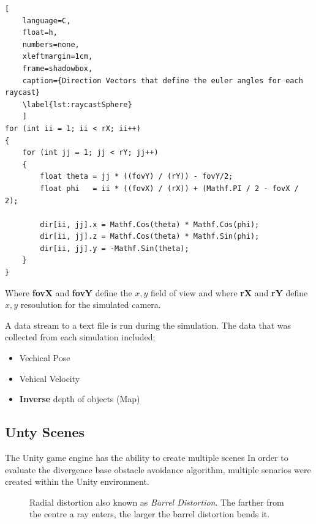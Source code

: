 \documentclass{UoNMCHA}
\numberwithin{equation}{section}
\begin{document}
\begin{lstlisting}[
    language=C,
	float=h,
	numbers=none,
    xleftmargin=1cm,
    frame=shadowbox,
	caption={Direction Vectors that define the euler angles for each raycast}
	\label{lst:raycastSphere}
	]
for (int ii = 1; ii < rX; ii++)
{
	for (int jj = 1; jj < rY; jj++)
	{
		float theta = jj * ((fovY) / (rY)) - fovY/2;
		float phi   = ii * ((fovX) / (rX)) + (Mathf.PI / 2 - fovX / 2);

		dir[ii, jj].x = Mathf.Cos(theta) * Mathf.Cos(phi);
		dir[ii, jj].z = Mathf.Cos(theta) * Mathf.Sin(phi);
		dir[ii, jj].y = -Mathf.Sin(theta);
	}
}
\end{lstlisting}
Where \textbf{fovX} and \textbf{fovY} define the $x, y$ field of view and where \textbf{rX} and \textbf{rY} define $x, y$ resoulution for the simulated camera. 

A data stream to a text file is run during the simulation. The data that was collected from each simulation included;
\begin{itemize}
	\item Vechical Pose
	\item Vehical Velocity
	\item \textbf{Inverse} depth of objects (Map)
\end{itemize}
\subsection{Unty Scenes}
The Unity game engine has the ability to create multiple scenes In order to evaluate the divergence base obstacle avoidance algorithm, multiple senarios were created within the Unity environment.

\begin{figure}[ht]
	\caption{Radial distortion also known as \textit{Barrel Distortion}. The farther from the centre a ray enters, the larger the barrel distortion bends it.}	
	\label{fig:RadialDistortion}
\end{figure}
\end{document}
